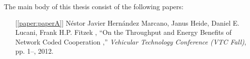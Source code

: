 \noindent The main body of this thesis consist of the following papers:
\begin{itemize}

   \item[{[\ref{paper:paperA}]}] N\'estor Javier Hern\'andez Marcano, Janus Heide, Daniel E. Lucani, Frank H.P. Fitzek  , ``On the Throughput and Energy Benefits of Network Coded Cooperation
 ,'' \emph{Vehicular Technology Conference (VTC Fall)}, pp. 1--, 2012.







\end{itemize}

